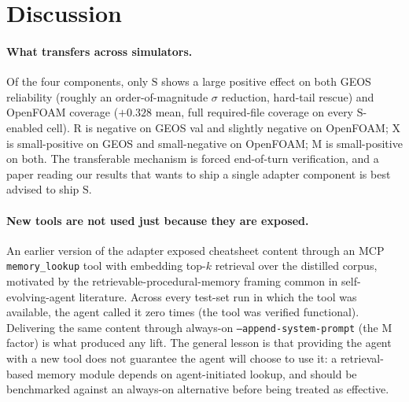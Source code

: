 \documentclass{article}
\begin{document}
\section{Discussion}
\label{sec:discussion}
\label{sec:analysis}
\label{subsec:limitations}

\paragraph{What transfers across simulators.} Of the four components, only $\mathrm{S}$ shows a large positive effect on both GEOS reliability (roughly an order-of-magnitude $\sigma$ reduction, hard-tail rescue) and OpenFOAM coverage ($+0.328$ mean, full required-file coverage on every $\mathrm{S}$-enabled cell). $\mathrm{R}$ is negative on GEOS val and slightly negative on OpenFOAM; $\mathrm{X}$ is small-positive on GEOS and small-negative on OpenFOAM; $\mathrm{M}$ is small-positive on both. The transferable mechanism is forced end-of-turn verification, and a paper reading our results that wants to ship a single adapter component is best advised to ship $\mathrm{S}$.

\paragraph{New tools are not used just because they are exposed.} An earlier version of the adapter exposed cheatsheet content through an MCP \texttt{memory\_lookup} tool with embedding top-$k$ retrieval over the distilled corpus, motivated by the retrievable-procedural-memory framing common in self-evolving-agent literature. Across every test-set run in which the tool was available, the agent called it zero times (the tool was verified functional). Delivering the same content through always-on \texttt{--append-system-prompt} (the M factor) is what produced any lift. The general lesson is that providing the agent with a new tool does not guarantee the agent will choose to use it: a retrieval-based memory module depends on agent-initiated lookup, and should be benchmarked against an always-on alternative before being treated as effective.
\end{document}
